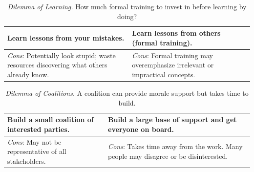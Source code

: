 \begin{center}
\begin{table}[H] %
\begin{tabular}{ | m{\dilemmatablewidth}| m{\dilemmatablewidth} | } 
  \hline
  \textbf{Learn lessons from your mistakes.} & 
  \textbf{Learn lessons from others (formal training).} \\ 
  \hline
  \textit{Cons}: Potentially look stupid; waste resources discovering what others already know. & 
  \textit{Cons}: Formal training may overemphasize irrelevant or impractical concepts. \\  
  \hline
\end{tabular}
\caption{
\textit{Dilemma of Learning.}
How much formal training to invest in before learning by doing?
}
\label{table:dilemma-lessons-learned-source}
\end{table}
\end{center}



\begin{center}
\begin{table}[H] %
\begin{tabular}{ | m{\dilemmatablewidth}| m{\dilemmatablewidth} | } 
  \hline
  \textbf{Build a small coalition of interested parties.} & 
  \textbf{Build a large base of support and get everyone on board.} \\ 
  \hline
  \textit{Cons}: May not be representative of all stakeholders. & 
  \textit{Cons}: Takes time away from the work. Many people may disagree or be disinterested. \\  
  \hline
\end{tabular}
\caption{
\textit{Dilemma of Coalitions.}
A coalition can provide morale support but takes time to build.
}
\label{table:dilemma-how-to-change}
\end{table}
\end{center}

